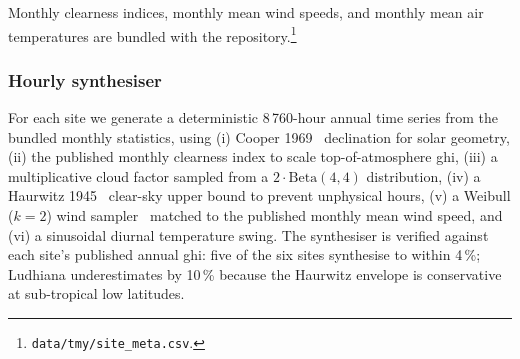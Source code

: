 \documentclass[11pt,a4paper]{article}
\begin{document}
\begin{table}[H]
\centering\small
\caption{Six bundled climate sites used by the energy simulator. Published GHI is from the source listed; the synthesiser reproduces it within 4\,\% on five sites and underestimates Ludhiana by 10\,\% (a known conservativeness of the Haurwitz envelope at low latitude).}\label{tab:sites}
\end{table}

Monthly clearness indices, monthly mean wind speeds, and monthly mean air temperatures are bundled with the repository.\footnote{\texttt{data/tmy/site\_meta.csv}.}

\subsubsection{Hourly synthesiser}\label{sec:synth}

For each site we generate a deterministic 8\,760-hour annual time series from the bundled monthly statistics, using (i) Cooper 1969~\cite{cooper1969absorption} declination for solar geometry, (ii) the published monthly clearness index to scale top-of-atmosphere \gls{ghi}, (iii) a multiplicative cloud factor sampled from a $2 \cdot \mathrm{Beta}(4,4)$ distribution, (iv) a Haurwitz 1945~\cite{haurwitz1945insolation} clear-sky upper bound to prevent unphysical hours, (v) a Weibull ($k=2$) wind sampler~\cite{justus1978winds} matched to the published monthly mean wind speed, and (vi) a sinusoidal diurnal temperature swing. The synthesiser is verified against each site's published annual \gls{ghi}: five of the six sites synthesise to within 4\,\%; Ludhiana underestimates by 10\,\% because the Haurwitz envelope is conservative at sub-tropical low latitudes.
\end{document}
